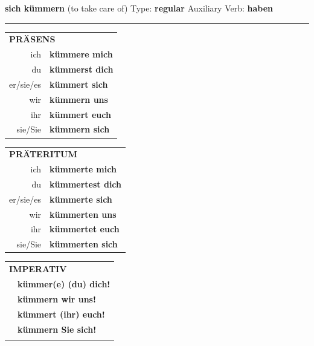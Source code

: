 \documentclass[10pt,a4paper]{revtex4-2}
\begin{document}
\begin{verbbox}
        {\Large \bf sich kümmern} (to take care of) \hfill Type: \textbf{regular} \hfill Auxiliary Verb: \textbf{haben} 
    
       \vspace{5pt}

    \hrule
    
    \vspace{5pt}

  \begin{tabular}{rl}
     \multicolumn{2}{l}{\textbf{PRÄSENS} }\\
    ich & \textbf{kümmere mich}\\
    du & \textbf{kümmerst dich}\\
    er/sie/es & \textbf{kümmert sich}\\
    wir & \textbf{kümmern uns}\\
    ihr & \textbf{kümmert euch}\\
    sie/Sie & \textbf{kümmern sich}\\
  \end{tabular}
  \hfill
     \begin{tabular}{rl}
    \multicolumn{2}{l}{\textbf{PRÄTERITUM} }\\
    ich & \textbf{kümmerte mich}\\
    du & \textbf{kümmertest dich}\\
    er/sie/es & \textbf{kümmerte sich}\\
    wir & \textbf{kümmerten uns}\\
    ihr & \textbf{kümmertet euch}\\
    sie/Sie & \textbf{kümmerten sich}\\
  \end{tabular}
  \hfill
  \begin{tabular}{rl}
     \multicolumn{2}{l}{\textbf{IMPERATIV} }\\
   & \textbf{kümmer(e) (du) dich!}\\
   & \textbf{kümmern wir uns!}\\
   & \textbf{kümmert (ihr) euch!}\\
   & \textbf{kümmern Sie sich!}\\
   & \vspace{10pt}
  \end{tabular}

    \vspace{10pt}


\end{verbbox}
\end{document}
